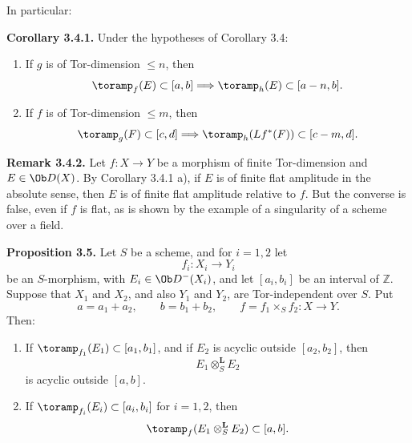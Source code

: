 \documentclass[11pt]{article}
\begin{document}
In particular:

\textbf{Corollary 3.4.1.} Under the hypotheses of Corollary 3.4:
\begin{enumerate}[label=\alph*)]
\item If \(g\) is of Tor-dimension \(\leq n\), then
\[
  \toramp_f(E)\subset[a,b]\Longrightarrow
  \toramp_h(E)\subset[a-n,b].
\]
\item If \(f\) is of Tor-dimension \(\leq m\), then
\[
  \toramp_g(F)\subset[c,d]\Longrightarrow
  \toramp_h(Lf^*(F))\subset[c-m,d].
\]
\end{enumerate}

\textbf{Remark 3.4.2.} Let \(f:X\to Y\) be a morphism of finite Tor-dimension and \(E\in \Ob D(X)\). By Corollary 3.4.1 a), if \(E\) is of finite flat amplitude in the absolute sense, then \(E\) is of finite flat amplitude relative to \(f\). But the converse is false, even if \(f\) is flat, as is shown by the example of a singularity of a scheme over a field.

\textbf{Proposition 3.5.} Let \(S\) be a scheme, and for \(i=1,2\) let
\[
  f_i:X_i\longrightarrow Y_i
\]
be an \(S\)-morphism, with \(E_i\in \Ob D^{-}(X_i)\), and let \([a_i,b_i]\) be an interval of \(\mathbb Z\). Suppose that \(X_1\) and \(X_2\), and also \(Y_1\) and \(Y_2\), are Tor-independent over \(S\). Put
\[
  a=a_1+a_2,\qquad b=b_1+b_2,\qquad
  f=f_1\times_S f_2:X\to Y.
\]
Then:
\begin{enumerate}[label=\alph*)]
\item If \(\toramp_{f_1}(E_1)\subset[a_1,b_1]\), and if \(E_2\) is acyclic outside \([a_2,b_2]\), then
\[
  E_1\otimes_S^{\mathbf L}E_2
\]
is acyclic outside \([a,b]\).

\item If \(\toramp_{f_i}(E_i)\subset[a_i,b_i]\) for \(i=1,2\), then
\[
  \toramp_f(E_1\otimes_S^{\mathbf L}E_2)\subset[a,b].
\]
\end{enumerate}
\end{document}
